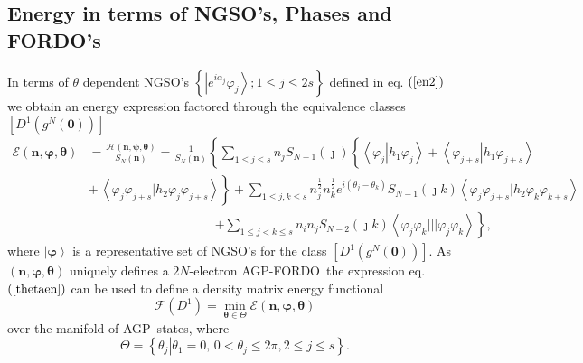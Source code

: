 \documentclass[aps,preprint]{revtex4}%
\begin{document}
\subsection{Energy in terms of NGSO's, Phases and FORDO's\label{EnON_NGSO}}

In terms of $\theta$ dependent NGSO's $\left\{  \left\vert e^{i\alpha_{j}%
}\varphi_{j}\right\rangle ;1\leq j\leq2s\right\}  $ defined in eq. $\left(
\ref{en2}\right)  $ we obtain an energy expression factored through the
equivalence classes $\left[  D^{1}\left(  g^{N}\left(  \mathbf{0}\right)
\right)  \right]  $
\begin{align}
\mathcal{E}\left(  \mathbf{n},\mathbf{\varphi},\mathbf{\theta}\right)   &
=\frac{\mathcal{H}\left(  \mathbf{n},\mathbf{\psi},\mathbf{\theta}\right)
}{S_{N}\left(  \mathbf{n}\right)  }=\frac{1}{S_{N}\left(  \mathbf{n}\right)
}\left\{  \sum_{1\leq j\leq s}n_{j}S_{N-1}\left(  \jmath\right)  \left\{
\overset{}{\left\langle \varphi_{j}\left\vert h_{1}\varphi_{j}\right.
\right\rangle +\left\langle \varphi_{j+s}\left\vert h_{1}\varphi_{j+s}\right.
\right\rangle }\right.  \right. \nonumber\\
&  \left.  +\overset{}{\,\left\langle \varphi_{j}\varphi_{j+s}|h_{2}%
\varphi_{j}\varphi_{j+s}\right\rangle }\right\}  +\sum_{1\leq j,k\leq s}%
n_{j}^{\frac{1}{2}}n_{k}^{\frac{1}{2}}e^{i\left(  \theta_{j}-\theta
_{k}\right)  }S_{N-1}\left(  \jmath k\right)  \left\langle \varphi_{j}%
\varphi_{j+s}|h_{2}\varphi_{k}\varphi_{k+s}\right\rangle \nonumber\\
&  \qquad\qquad\qquad\qquad\qquad\left.  +\sum_{1\leq j<k\leq s}n_{i}%
n_{j}S_{N-2}\left(  \jmath k\right)  \left\langle \varphi_{j}\varphi
_{k}|||\varphi_{j}\varphi_{k}\right\rangle \right\}  , \label{thetaen}%
\end{align}
where $\left\vert \mathbf{\varphi}\right\rangle $ is a representative set of
NGSO's for the class $\left[  D^{1}\left(  g^{N}\left(  \mathbf{0}\right)
\right)  \right]  $. As $\left(  \mathbf{n},\mathbf{\varphi,\theta}\right)  $
uniquely defines a $2N$-electron AGP-FORDO\ the expression eq. $\left(
\ref{thetaen}\right)  $ can be used to define a density matrix energy
functional
\begin{equation}
\mathcal{F}\left(  D^{1}\right)  =\min_{\mathbf{\theta\in}\Theta}%
\mathcal{E}\left(  \mathbf{n},\mathbf{\varphi},\mathbf{\theta}\right)
\end{equation}
over the manifold of AGP\ states, where
\begin{equation}
\Theta=\left\{  \left.  \theta_{j}\right\vert \theta_{1}=0,\,0<\theta_{j}%
\leq2\pi,2\leq j\leq s\right\}  .
\end{equation}
\end{document}
